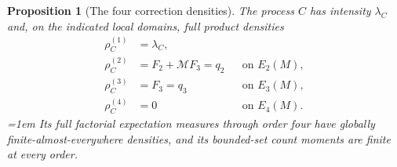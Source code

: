 \documentclass[11pt,a4paper]{article}
\numberwithin{equation}{section}
\newtheorem{proposition}[theorem]{Proposition}
\theoremstyle{definition}
\theoremstyle{remark}
\newcommand{\Mop}{\mathcal M}
\begin{document}
\begin{proposition}[The four correction densities]\label{prop:C-densities}
The process $C$ has intensity $\lambda_C$ and, on the indicated local
domains, full product densities
\begin{align}
 \rho_C^{(1)}&=\lambda_C,\label{eq:C1}\\
 \rho_C^{(2)}&=F_2+\Mop F_3=q_2
                      &&\text{on }E_2(M),\label{eq:C2}\\
 \rho_C^{(3)}&=F_3=q_3
                      &&\text{on }E_3(M),\label{eq:C3}\\
 \rho_C^{(4)}&=0
                      &&\text{on }E_4(M).\label{eq:C4}
\end{align}
\begingroup\emergencystretch=1em
Its full factorial expectation measures through order four have globally
finite-almost-everywhere densities, and its bounded-set count moments are
finite at every order.\par
\endgroup
\end{proposition}
\end{document}
